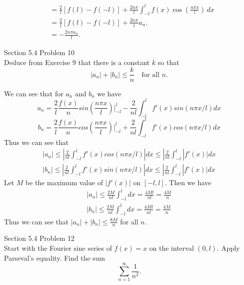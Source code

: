 \documentclass[answers,12pt,addpoints]{exam}
\begin{document}
\begin{questions}
\begin{solution}
\begin{align*}
            &= \frac{2}{l} \left[ f(l) - f(-l) \right] + \frac{2n\pi}{l} \int_{-l}^{l} f(x) \cos \left( \frac{n\pi x}{l} \right) \, dx \\
            &= \frac{2}{l} \left[ f(l) - f(-l) \right] + \frac{2n\pi}{l} a_n.\\
            &= -\frac{2n\pi a_n}{l}.
        \end{align*}
    \end{solution}
    \question[10] Section 5.4 Problem 10\\
    Deduce from Exercise 9 that there is a constant $k$ so that
    \[
    |a_n| + |b_n| \leq \frac{k}{n} \quad \text{for all } n.
    \]
    \begin{solution}
        We can see that for $a_n$ and $b_n$ we have\\
        $$a_n = \frac{2}{l} \frac{f(x)}{n} sin(\frac{n\pi x}{l})|_{-l}^l - \frac{2}{nl} \int_{-l}^l f'(x) sin(n\pi x/ l) dx$$
        $$b_n = \frac{2}{l} \frac{f(x)}{n} cos(\frac{n\pi x}{l})|_{-l}^l + \frac{2}{nl} \int_{-l}^l f'(x) cos(n \pi x/ l) dx$$
        Thus we can see that
        \begin{align*}
            |a_n| \leq |\frac{2}{nl} \int_{-l}^l f'(x) cos(n \pi x/ l)| dx \leq |\frac{2}{nl} \int_{-l}^l |f'(x)| dx\\
            |b_n| \leq |\frac{2}{nl} \int_{-l}^l f'(x) sin(n \pi x/ l)| dx \leq |\frac{2}{nl} \int_{-l}^l |f'(x)| dx
        \end{align*}
        Let $M$ be the maximum value of $|f'(x)|$ on $[-l,l]$. Then we have
        \begin{align*}
            |a_n| \leq \frac{2M}{nl} \int_{-l}^l dx = \frac{4Ml}{nl} = \frac{4M}{n} \\
            |b_n| \leq \frac{2M}{nl} \int_{-l}^l dx = \frac{4Ml}{nl} = \frac{4M}{n}
        \end{align*}
        Thus we can see that $|a_n| + |b_n| \leq \frac{8M}{n}$ for all $n$.
        
    \end{solution}

    \question[10] Section 5.4 Problem 12\\
    Start with the Fourier sine series of $f(x) = x$ on the interval $(0, l)$. Apply
    Parseval's equality. Find the sum 
    \[
    \sum_{n=1}^{\infty} \frac{1}{n^2}.
    \]


\end{questions}
\end{document}
